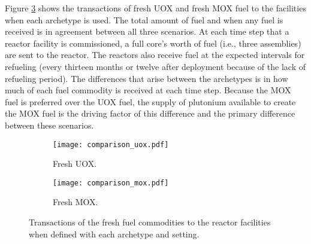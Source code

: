 Figure \ref{fig:comparison_fuel} shows the transactions of fresh UOX 
and fresh MOX fuel to the facilities when each archetype is used. 
The total amount of fuel and when any fuel is received is in 
agreement between all three scenarios. At each time step that 
a reactor facility is commissioned, a full core's worth of fuel (i.e., 
three assemblies) are sent to the reactor. The reactors also receive fuel 
at the expected intervals for refueling (every thirteen months or twelve 
after deployment because of the lack of refueling period). The differences 
that arise between the archetypes is in how much of each fuel commodity 
is received at each time step. Because the \gls{MOX} fuel is preferred 
over the \gls{UOX} fuel, the supply of plutonium available to create the 
\gls{MOX} fuel is the driving factor of this difference and the primary 
difference between these scenarios. 

\begin{figure}[ht!]
    \centering
    \begin{subfigure}[b]{0.48\textwidth}
        \centering
        \texttt{[image: comparison\_uox.pdf]}
        \caption{Fresh UOX.}
        \label{fig:comparison_uox}
    \end{subfigure}
    \hfill
    \begin{subfigure}[b]{0.48\textwidth}
        \centering
        \texttt{[image: comparison\_mox.pdf]}
        \caption{Fresh MOX.}
        \label{fig:comparison_mox}
    \end{subfigure}
       \caption{Transactions of the fresh fuel commodities to the 
       reactor facilities when defined with each archetype and 
       setting.}
       \label{fig:comparison_fuel}
\end{figure}

